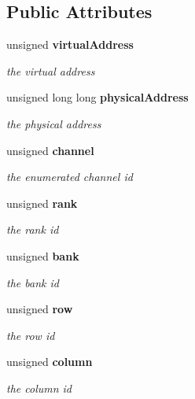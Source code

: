 \subsection*{Public Attributes}
\begin{CompactItemize}
\item 
unsigned {\bf virtualAddress}\label{class_d_r_a_m_sim_i_i_1_1addresses_92f5d89fcc4eb9d06713367ac5f66c06}

\begin{CompactList}\small\item\em the virtual address \item\end{CompactList}\item 
unsigned long long {\bf physicalAddress}\label{class_d_r_a_m_sim_i_i_1_1addresses_9cc57650e9fb4fc626421e3b4189291f}

\begin{CompactList}\small\item\em the physical address \item\end{CompactList}\item 
unsigned {\bf channel}\label{class_d_r_a_m_sim_i_i_1_1addresses_8927448a93ffdaf2822fcab2ed310cab}

\begin{CompactList}\small\item\em the enumerated channel id \item\end{CompactList}\item 
unsigned {\bf rank}\label{class_d_r_a_m_sim_i_i_1_1addresses_107119444351eb07b32d65104e8e52b0}

\begin{CompactList}\small\item\em the rank id \item\end{CompactList}\item 
unsigned {\bf bank}\label{class_d_r_a_m_sim_i_i_1_1addresses_2cc322f2bc822d52ebd9a4f680f92329}

\begin{CompactList}\small\item\em the bank id \item\end{CompactList}\item 
unsigned {\bf row}\label{class_d_r_a_m_sim_i_i_1_1addresses_ae39982bdc35afae14aee5d3192d61a3}

\begin{CompactList}\small\item\em the row id \item\end{CompactList}\item 
unsigned {\bf column}\label{class_d_r_a_m_sim_i_i_1_1addresses_b55d06fc2c46817d575ae74671013307}

\begin{CompactList}\small\item\em the column id \item\end{CompactList}\end{CompactItemize}


